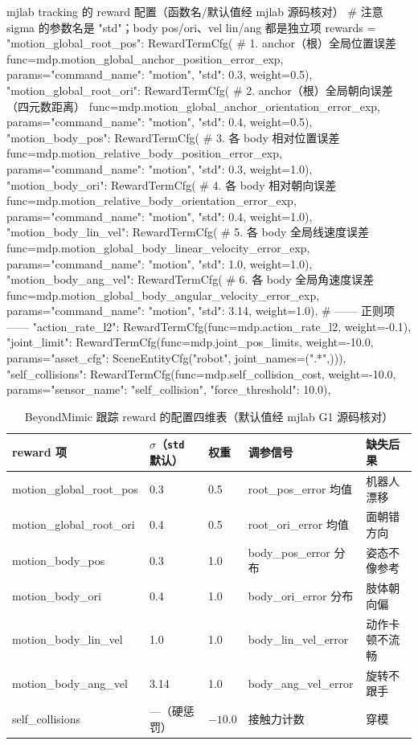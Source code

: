 \begin{codebox}[Python]{mjlab tracking 的 reward 配置（函数名/默认值经 mjlab 源码核对）}
# 注意 sigma 的参数名是 "std"；body pos/ori、vel lin/ang 都是独立项
rewards = {
    "motion_global_root_pos":  RewardTermCfg(   # 1. anchor（根）全局位置误差
        func=mdp.motion_global_anchor_position_error_exp,
        params={"command_name": "motion", "std": 0.3}, weight=0.5),
    "motion_global_root_ori":  RewardTermCfg(   # 2. anchor（根）全局朝向误差（四元数距离）
        func=mdp.motion_global_anchor_orientation_error_exp,
        params={"command_name": "motion", "std": 0.4}, weight=0.5),
    "motion_body_pos":         RewardTermCfg(   # 3. 各 body 相对位置误差
        func=mdp.motion_relative_body_position_error_exp,
        params={"command_name": "motion", "std": 0.3}, weight=1.0),
    "motion_body_ori":         RewardTermCfg(   # 4. 各 body 相对朝向误差
        func=mdp.motion_relative_body_orientation_error_exp,
        params={"command_name": "motion", "std": 0.4}, weight=1.0),
    "motion_body_lin_vel":     RewardTermCfg(   # 5. 各 body 全局线速度误差
        func=mdp.motion_global_body_linear_velocity_error_exp,
        params={"command_name": "motion", "std": 1.0}, weight=1.0),
    "motion_body_ang_vel":     RewardTermCfg(   # 6. 各 body 全局角速度误差
        func=mdp.motion_global_body_angular_velocity_error_exp,
        params={"command_name": "motion", "std": 3.14}, weight=1.0),
    # —— 正则项 ——
    "action_rate_l2": RewardTermCfg(func=mdp.action_rate_l2, weight=-0.1),
    "joint_limit":    RewardTermCfg(func=mdp.joint_pos_limits, weight=-10.0,
        params={"asset_cfg": SceneEntityCfg("robot", joint_names=(".*",))}),
    "self_collisions": RewardTermCfg(func=mdp.self_collision_cost, weight=-10.0,
        params={"sensor_name": "self_collision", "force_threshold": 10.0}),
}
\end{codebox}

\begin{table}[ht]
\centering
\small
\caption{BeyondMimic 跟踪 reward 的配置四维表（默认值经 mjlab G1 源码核对）}
\label{tab:rlmc-imit-rewardterms}
\begin{tabular}{@{}lllll@{}}
\toprule
reward 项 & $\sigma$（\texttt{std} 默认） & 权重 & 调参信号 & 缺失后果 \\
\midrule
motion\_global\_root\_pos & 0.3 & 0.5 & root\_pos\_error 均值 & 机器人漂移 \\
motion\_global\_root\_ori & 0.4 & 0.5 & root\_ori\_error 均值 & 面朝错方向 \\
motion\_body\_pos & 0.3 & 1.0 & body\_pos\_error 分布 & 姿态不像参考 \\
motion\_body\_ori & 0.4 & 1.0 & body\_ori\_error 分布 & 肢体朝向偏 \\
motion\_body\_lin\_vel & 1.0 & 1.0 & body\_lin\_vel\_error & 动作卡顿不流畅 \\
motion\_body\_ang\_vel & 3.14 & 1.0 & body\_ang\_vel\_error & 旋转不跟手 \\
self\_collisions & ---（硬惩罚） & $-10.0$ & 接触力计数 & 穿模 \\
\bottomrule
\end{tabular}
\end{table}

